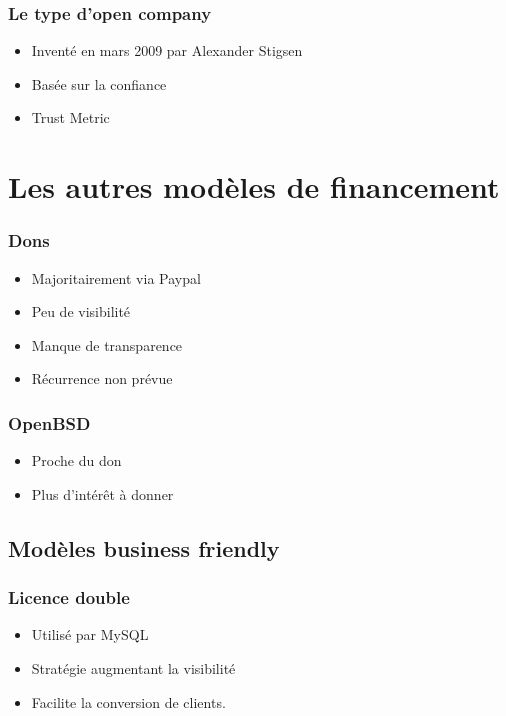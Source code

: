 \begin{frame}
\frametitle{Le type d'open company}

\begin{itemize}
    \itemsep1.5em
    \item Inventé en mars 2009 par Alexander Stigsen
    \item Basée sur la confiance
    \item Trust Metric
\end{itemize}
\end{frame}


    \section{Les autres modèles de financement}

\begin{frame}
\frametitle{Dons}

\begin{itemize}
    \itemsep1.5em
    \item Majoritairement via Paypal
    \item Peu de visibilité
    \item Manque de transparence
    \item Récurrence non prévue
\end{itemize}
\end{frame}


\begin{frame}
\frametitle{OpenBSD}

\begin{itemize}
    \itemsep1.5em
    \item Proche du don
    \item Plus d'intérêt à donner
\end{itemize}
\end{frame}

    \subsection{Modèles business friendly}

\begin{frame}
\frametitle{Licence double}

\begin{itemize}
    \itemsep1.5em
    \item Utilisé par MySQL
    \item Stratégie augmentant la visibilité
    \item Facilite la conversion de clients.
\end{itemize}
\end{frame}


